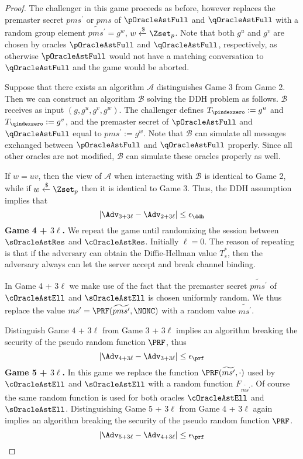 \begin{proof}
 The challenger in this game proceeds as before, however replaces the premaster secret $pms^{\prime}$ or $pms$ of $\pOracleAstFull$ and $\qOracleAstFull$ with a random group element $\widetilde{pms^{\prime}} = g^w$, $w \xleftarrow{\$} \Zset_p$. Note that both $g^u$ and $g^v$ are chosen by oracles $\pOracleAstFull$ and $\qOracleAstFull$, respectively, as otherwise $\pOracleAstFull$ would not have a matching conversation to $\qOracleAstFull$ and the game would be aborted.

 Suppose that there exists an algorithm $\mathcal{A}$ distinguishes Game 3 from Game 2. Then we can construct an algorithm $\mathcal{B}$ solving the DDH problem as follows. $\mathcal{B}$ receives as input $(g,g^u,g^v,g^w)$. The challenger defines $T_{\pindexzero} := g^u$ and $T_{\qindexzero} := g^v$, and the premaster secret of $\pOracleAstFull$ and $\qOracleAstFull$ equal to $pms^{\prime} := g^w$. Note that $\mathcal{B}$ can simulate all messages exchanged between $\pOracleAstFull$ and $\qOracleAstFull$ properly. Since all other oracles are not modified, $\mathcal{B}$ can simulate these oracles properly as well.

 If $w=uv$, then the view of $\mathcal{A}$ when interacting with $\mathcal{B}$ is identical to Game 2, while if $w \xleftarrow{\$}\Zset_p$ then it is identical to Game 3. Thus, the DDH assumption implies that
 \begin{equation}
  |\Adv_{3 + 3\ell} - \Adv_{2 + 3\ell}| \leq \epsilon_{\ddh}
 \end{equation}%
%
%
 \textbf{Game 4 + $3\ell$.} We repeat the game until randomizing the session between $\sOracleAstRes$ and $\cOracleAstRes$. Initially $\ell = 0$. The reason of repeating is that if the adversary can obtain the Diffie-Hellman value $T_s^{\ast}$, then the adversary always can let the server accept and break channel binding.

 In Game 4 + 3$\ell$ we make use of the fact that the premaster secret $\widetilde{pms^{\prime}}$ of $\cOracleAstEll$ and $\sOracleAstEll$ is chosen uniformly random. We thus replace the value $ms^{\prime} = \PRF(\widetilde{pms^{\prime}}, \NONC)$ with a random value $\widetilde{ms^{\prime}}$.

 Distinguish Game 4 + 3$\ell$ from Game 3 + 3$\ell$ implies an algorithm breaking the security of the pseudo random function $\PRF$, thus
 \begin{equation}
  |\Adv_{4 + 3\ell} - \Adv_{3 + 3\ell}| \leq \epsilon_{\prf}
 \end{equation}%
%
%
 \textbf{Game 5 + $3\ell$.} In this game we replace the function $\PRF(\widetilde{ms^{\prime}}, \cdot)$ used by $\cOracleAstEll$ and $\sOracleAstEll$ with a random function $F_{\widetilde{ms^{\prime}}}$. Of course the same random function is used for both oracles $\cOracleAstEll$ and $\sOracleAstEll$. Distinguishing Game 5 + 3$\ell$ from Game 4 + 3$\ell$ again implies an algorithm breaking the security of the pseudo random function $\PRF$.
 \begin{equation}
  |\Adv_{5 + 3\ell} - \Adv_{4 + 3\ell}| \leq \epsilon_{\prf}
 \end{equation}%


\end{proof}
